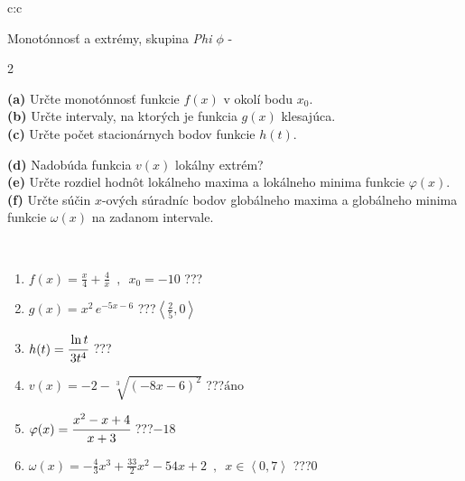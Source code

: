 \documentclass[10pt]{report}
\begin{document}
\newpage
\thispagestyle{empty}
\begin{tabular}{c:c}
\begin{minipage}[c][104.5mm][t]{0.5\linewidth}
\begin{center}
\vspace{7mm}
{\huge Monotónnosť a extrémy, skupina \textit{Phi $\phi$} -}\\[5mm]
\begin{minipage}{0.95\linewidth}
\begin{center}
{\small \begin{multicols}{2} \raggedright
\textbf{(a)} Určte monotónnosť funkcie \(f(x)\) v okolí bodu \(x_0\). \\[1mm]
\textbf{(b)} Určte intervaly, na ktorých je funkcia \(g(x)\) klesajúca. \\[1mm]
\textbf{(c)} Určte počet stacionárnych bodov funkcie \(h(t)\). \par \columnbreak
\textbf{(d)} Nadobúda funkcia \(v(x)\) lokálny extrém? \\[1mm]
\textbf{(e)} Určte rozdiel hodnôt lokálneho maxima a lokálneho minima funkcie \(\varphi(x)\). \\[1mm]
\textbf{(f)} Určte súčin \(x\)-ových súradníc bodov globálneho maxima a globálneho minima funkcie \(\omega(x)\) na zadanom intervale. \\[1mm]
\end{multicols}
}
\end{center}
\end{minipage}
\\[4mm]
\begin{minipage}{0.79\linewidth}
\begin{center}
\begin{varwidth}{\linewidth}
\begin{enumerate}
\normalsize
\item $f(x)=\frac{x}{4}+\frac{4}{x} \enspace , \enspace x_0=-10$\quad \dotfill\; ???\;\dotfill \quad {}
\item $g(x)=x^2\, e^{-5x-6}$\quad \dotfill\; ???\;\dotfill \quad $\left\langle\frac{2}{5} , 0\right\rangle$
\item $h(t)=\cfrac{\ln t}{3t^4}$\quad \dotfill\; ???\;\dotfill {}
\item $v(x)=-2-\sqrt[3]{(-8x-6)^2}$\quad \dotfill\; ???\;\dotfill \quad $\text{áno}$
\item $\varphi(x)=\cfrac{x^2-x+4}{x+3}$\quad \dotfill\; ???\;\dotfill \quad $-18$
\item $\omega(x)=-\frac{4}{3}x^3+\frac{33}{2}x^2-54x+2 \enspace , \enspace x\in\left\langle0 , 7\right\rangle$\quad \dotfill\; ???\;\dotfill \quad $0$

\end{enumerate}
\end{varwidth}
\end{center}
\end{minipage}
\end{center}
\end{minipage}
\end{tabular}
\end{document}
